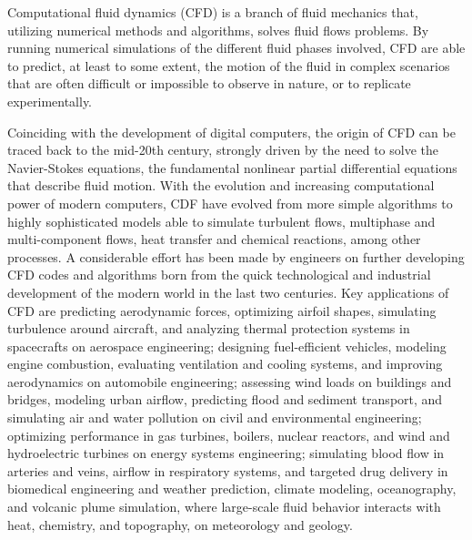 Computational fluid dynamics (CFD) is a branch of fluid mechanics that, utilizing numerical methods and algorithms, solves fluid flows problems. By running numerical simulations of the different fluid phases involved, CFD are able to predict, at least to some extent, the motion of the fluid in complex scenarios that are often difficult or impossible to observe in nature, or to replicate experimentally. 

Coinciding with the development of digital computers, the origin of CFD can be traced back to the mid-20th century, strongly driven by the need to solve the Navier-Stokes equations, the fundamental nonlinear partial differential equations that describe fluid motion. With the evolution and increasing computational power of modern computers, CDF have evolved from more simple algorithms to highly sophisticated models able to simulate turbulent flows, multiphase and multi-component flows, heat transfer and chemical reactions, among other processes. A considerable effort has been made by engineers on further developing  CFD codes and algorithms born from the quick technological and industrial development of the modern world in the last two centuries. Key applications of CFD are predicting aerodynamic forces, optimizing airfoil shapes, simulating turbulence around aircraft, and analyzing thermal protection systems in spacecrafts on aerospace engineering; designing fuel-efficient vehicles, modeling engine combustion, evaluating ventilation and cooling systems, and improving aerodynamics on automobile engineering;  assessing wind loads on buildings and bridges, modeling urban airflow, predicting flood and sediment transport, and simulating air and water pollution on civil and environmental engineering;  optimizing performance in gas turbines, boilers, nuclear reactors, and wind and hydroelectric turbines on energy systems engineering; simulating blood flow in arteries and veins, airflow in respiratory systems, and targeted drug delivery in biomedical engineering and weather prediction, climate modeling, oceanography, and volcanic plume simulation, where large-scale fluid behavior interacts with heat, chemistry, and topography, on meteorology and geology.

